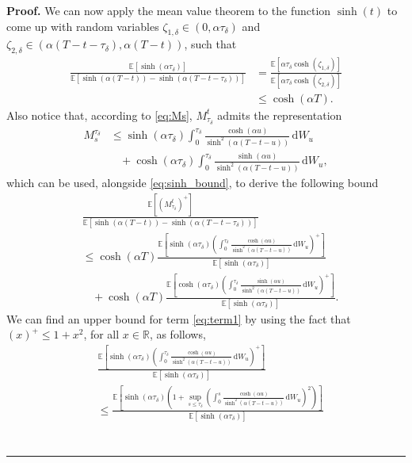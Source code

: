 \documentclass{tufte-handout}
\newcommand{\E}{\mathbb{E}} %
\newcommand{\R}{\mathbb{R}} %
\newcommand{\dif}{\mathrm{d}}
\newenvironment{pf}[1][Proof]{\textbf{#1.} }{\ \rule{0.5em}{0.5em}}
\begin{document}
\begin{pf}
		We can now apply the mean value theorem to the function $\sinh(t)$ to come up with random variables $\zeta_{1,\delta} \in (0, \alpha \tau_\delta)$ and $\zeta_{2,\delta} \in (\alpha(T - t - \tau_\delta), \alpha(T - t))$, such that
		\begin{align}\label{eq:sinh_bound}
			\frac{\E\left[\sinh(\alpha \tau_\delta)\right]}{\E\left[\sinh(\alpha(T - t)) - \sinh(\alpha (T - t - \tau_\delta))\right]} &= \frac{\E\left[\alpha\tau_\delta\cosh(\zeta_{1,\delta})\right]}{\E\left[\alpha\tau_\delta \cosh(\zeta_{2,\delta})\right]} \nonumber \\ 
			&\leq \cosh(\alpha T).
		\end{align}
		Also notice that, according to \eqref{eq:Ms}, $M_{\tau_\delta}^t$ admits the representation
		\begin{align*}
		M_s^{\tau_\delta} &\leq \sinh(\alpha\tau_\delta)\int_{0}^{\tau_\delta}\frac{\cosh(\alpha u)}{\sinh^2(\alpha(T - t - u))}\,\dif W_u \\
		&\ \ \ \ + \cosh(\alpha\tau_\delta)\int_{0}^{\tau_\delta}\frac{\sinh(\alpha u)}{\sinh^2(\alpha(T - t - u))}\,\dif W_u,
		\end{align*}
		which can be used, alongside \eqref{eq:sinh_bound}, to derive the following bound
		\begin{align}
			&\frac{\E\left[\left(M_{\tau_\delta}^t\right)^+\right]}{\E\left[\sinh(\alpha(T - t)) - \sinh(\alpha (T - t - \tau_\delta))\right]} \nonumber \\ 
			&\leq \cosh(\alpha T)\frac{\E\left[\sinh(\alpha\tau_\delta)\left(\int_{0}^{\tau_\delta}\frac{\cosh(\alpha u)}{\sinh^2(\alpha(T - t - u))}\,\dif W_u\right)^+\right]}{\E\left[\sinh(\alpha\tau_\delta)\right]} \label{eq:term1} \\
			&\ \ \ \ +\cosh(\alpha T)\frac{\E\left[\cosh(\alpha\tau_\delta)\left(\int_{0}^{\tau_\delta}\frac{\sinh(\alpha u)}{\sinh^2(\alpha(T - t - u))}\,\dif W_u\right)^+\right]}{\E\left[\sinh(\alpha\tau_\delta)\right]}. \label{eq:term2}
		\end{align}
		We can find an upper bound for term \eqref{eq:term1} by using the fact that $(x)^+ \leq 1 + x^2$, for all $x\in \R$, as follows,
		\begin{align*}
			&\frac{\E\left[\sinh(\alpha\tau_\delta)\left(\int_{0}^{\tau_\delta}\frac{\cosh(\alpha u)}{\sinh^2(\alpha(T - t - u))}\,\dif W_u\right)^+\right]}{\E\left[\sinh(\alpha\tau_\delta)\right]} \\
			&\leq \frac{\E\left[\sinh(\alpha\tau_\delta)\left(1 + \sup_{s\leq \tau_\delta}\left(\int_{0}^{s}\frac{\cosh(\alpha u)}{\sinh^2(\alpha(T - t - u))}\,\dif W_u\right)^2\right)\right]}{\E\left[\sinh(\alpha\tau_\delta)\right]} \\

\end{align*}
\end{pf}
\end{document}
